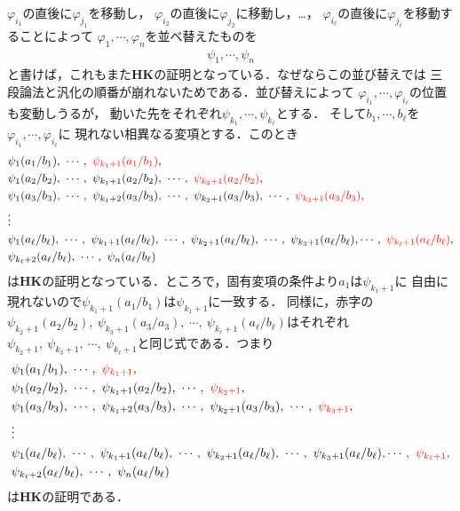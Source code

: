 \begin{metaprf}
		$\varphi_{i_{1}}$の直後に$\varphi_{j_{1}}$を移動し，
		$\varphi_{i_{2}}$の直後に$\varphi_{j_{2}}$に移動し，…，
		$\varphi_{i_{\ell}}$の直後に$\varphi_{j_{\ell}}$を移動することによって
		$\varphi_{1},\cdots,\varphi_{n}$を並べ替えたものを
		\begin{align}
			\psi_{1},\cdots,\psi_{n}
		\end{align}
		と書けば，これもまた{\bf HK}の証明となっている．なぜならこの並び替えでは
		三段論法と汎化の順番が崩れないためである．並び替えによって
		$\varphi_{i_{1}},\cdots,\varphi_{i_{\ell}}$の位置も変動しうるが，
		動いた先をそれぞれ$\psi_{k_{1}},\cdots,\psi_{k_{\ell}}$とする．
		そして$b_{1},\cdots,b_{\ell}$を$\varphi_{i_{1}},\cdots,\varphi_{i_{\ell}}$に
		現れない相異なる変項とする．このとき
		\begin{align}
			&\psi_{1}(a_{1}/b_{1}),\ \cdots,\ \textcolor{red}{\psi_{k_{1}+1}(a_{1}/b_{1})}, \\
			&\psi_{1}(a_{2}/b_{2}),\ \cdots,\ \psi_{k_{1}+1}(a_{2}/b_{2}),\ \cdots,\ \textcolor{red}{\psi_{k_{2}+1}(a_{2}/b_{2})}, \\
			&\psi_{1}(a_{3}/b_{3}),\ \cdots,\ \psi_{k_{1}+2}(a_{3}/b_{3}),\ \cdots,\ \psi_{k_{2}+1}(a_{3}/b_{3}),\ \cdots,\ \textcolor{red}{\psi_{k_{3}+1}(a_{3}/b_{3})}, \\
			&\vdots \\
			&\psi_{1}(a_{\ell}/b_{\ell}),\ \cdots,\ \psi_{k_{1}+1}(a_{\ell}/b_{\ell}),\ \cdots,\ \psi_{k_{2}+1}(a_{\ell}/b_{\ell}),\ \cdots,\ 
			\psi_{k_{3}+1}(a_{\ell}/b_{\ell}), \cdots,\ \textcolor{red}{\psi_{k_{\ell}+1}(a_{\ell}/b_{\ell})}, \\
			&\psi_{k_{\ell}+2}(a_{\ell}/b_{\ell}),\ \cdots,\ \psi_{n}(a_{\ell}/b_{\ell})
		\end{align}
		は{\bf HK}の証明となっている．ところで，固有変項の条件より$a_{1}$は$\psi_{k_{1}+1}$に
		自由に現れないので$\psi_{k_{1}+1}(a_{1}/b_{1})$は$\psi_{k_{1}+1}$に一致する．
		同様に，赤字の$\psi_{k_{2}+1}(a_{2}/b_{2}),\ \psi_{k_{3}+1}(a_{3}/a_{3}),\ 
		\cdots,\ \psi_{k_{\ell}+1}(a_{\ell}/b_{\ell})$はそれぞれ
		$\psi_{k_{2}+1},\ \psi_{k_{3}+1},\ \cdots,\ \psi_{k_{\ell}+1}$と同じ式である．つまり
		\begin{align}
			&\psi_{1}(a_{1}/b_{1}),\ \cdots,\ \textcolor{red}{\psi_{k_{1}+1}}, \\
			&\psi_{1}(a_{2}/b_{2}),\ \cdots,\ \psi_{k_{1}+1}(a_{2}/b_{2}),\ \cdots,\ \textcolor{red}{\psi_{k_{2}+1}}, \\
			&\psi_{1}(a_{3}/b_{3}),\ \cdots,\ \psi_{k_{1}+2}(a_{3}/b_{3}),\ \cdots,\ \psi_{k_{2}+1}(a_{3}/b_{3}),\ \cdots,\ \textcolor{red}{\psi_{k_{3}+1}}, \\
			&\vdots \\
			&\psi_{1}(a_{\ell}/b_{\ell}),\ \cdots,\ \psi_{k_{1}+1}(a_{\ell}/b_{\ell}),\ \cdots,\ \psi_{k_{2}+1}(a_{\ell}/b_{\ell}),\ \cdots,\ 
			\psi_{k_{3}+1}(a_{\ell}/b_{\ell}), \cdots,\ \textcolor{red}{\psi_{k_{\ell}+1}}, \\
			&\psi_{k_{\ell}+2}(a_{\ell}/b_{\ell}),\ \cdots,\ \psi_{n}(a_{\ell}/b_{\ell})
		\end{align}
		は{\bf HK}の証明である．
		

\end{metaprf}
